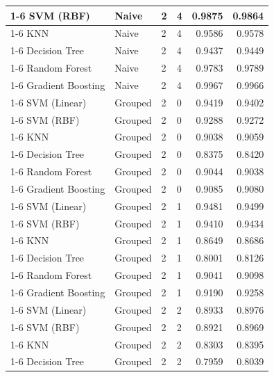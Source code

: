 \begin{table}
\begin{tabular}{llllrr}
\cline{1-6} \cline{2-6} \cline{3-6}
SVM (RBF) & Naive & 2 & 4 & 0.9875 & 0.9864 \\
\cline{1-6} \cline{2-6} \cline{3-6}
KNN & Naive & 2 & 4 & 0.9586 & 0.9578 \\
\cline{1-6} \cline{2-6} \cline{3-6}
Decision Tree & Naive & 2 & 4 & 0.9437 & 0.9449 \\
\cline{1-6} \cline{2-6} \cline{3-6}
Random Forest & Naive & 2 & 4 & 0.9783 & 0.9789 \\
\cline{1-6} \cline{2-6} \cline{3-6}
Gradient Boosting & Naive & 2 & 4 & 0.9967 & 0.9966 \\
\cline{1-6} \cline{2-6} \cline{3-6}
SVM (Linear) & Grouped & 2 & 0 & 0.9419 & 0.9402 \\
\cline{1-6} \cline{2-6} \cline{3-6}
SVM (RBF) & Grouped & 2 & 0 & 0.9288 & 0.9272 \\
\cline{1-6} \cline{2-6} \cline{3-6}
KNN & Grouped & 2 & 0 & 0.9038 & 0.9059 \\
\cline{1-6} \cline{2-6} \cline{3-6}
Decision Tree & Grouped & 2 & 0 & 0.8375 & 0.8420 \\
\cline{1-6} \cline{2-6} \cline{3-6}
Random Forest & Grouped & 2 & 0 & 0.9044 & 0.9038 \\
\cline{1-6} \cline{2-6} \cline{3-6}
Gradient Boosting & Grouped & 2 & 0 & 0.9085 & 0.9080 \\
\cline{1-6} \cline{2-6} \cline{3-6}
SVM (Linear) & Grouped & 2 & 1 & 0.9481 & 0.9499 \\
\cline{1-6} \cline{2-6} \cline{3-6}
SVM (RBF) & Grouped & 2 & 1 & 0.9410 & 0.9434 \\
\cline{1-6} \cline{2-6} \cline{3-6}
KNN & Grouped & 2 & 1 & 0.8649 & 0.8686 \\
\cline{1-6} \cline{2-6} \cline{3-6}
Decision Tree & Grouped & 2 & 1 & 0.8001 & 0.8126 \\
\cline{1-6} \cline{2-6} \cline{3-6}
Random Forest & Grouped & 2 & 1 & 0.9041 & 0.9098 \\
\cline{1-6} \cline{2-6} \cline{3-6}
Gradient Boosting & Grouped & 2 & 1 & 0.9190 & 0.9258 \\
\cline{1-6} \cline{2-6} \cline{3-6}
SVM (Linear) & Grouped & 2 & 2 & 0.8933 & 0.8976 \\
\cline{1-6} \cline{2-6} \cline{3-6}
SVM (RBF) & Grouped & 2 & 2 & 0.8921 & 0.8969 \\
\cline{1-6} \cline{2-6} \cline{3-6}
KNN & Grouped & 2 & 2 & 0.8303 & 0.8395 \\
\cline{1-6} \cline{2-6} \cline{3-6}
Decision Tree & Grouped & 2 & 2 & 0.7959 & 0.8039 \\

\end{tabular}
\end{table}
